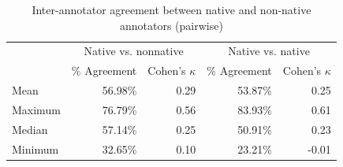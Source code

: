 		
		\begin{table}[htb]
			\centering
			\caption{Inter-annotator agreement between native and non-native annotators (pairwise)}
			\begin{tabular}{lrrrr}
			\toprule
			& \multicolumn{2}{c}{Native vs. nonnative} & \multicolumn{2}{c}{Native vs. native} \\
			\cmidrule(lr){2-3} \cmidrule(lr){4-5}
			& \% Agreement & Cohen's $\kappa$ & \% Agreement & Cohen's $\kappa$  \\
			\midrule
Mean	&56.98\%	 & 0.29  & 53.87\%	& 0.25\\
Maximum&	76.79\%	& 0.56 & 83.93\%	 & 0.61\\
Median	& 57.14\%	 &0.25 &  50.91\%	& 0.23 \\
Minimum	&32.65\%	 & 0.10 &  23.21\% &	-0.01\\
			\bottomrule
			\end{tabular}
			\label{tab:agreement:L1}
		\end{table} 
		
